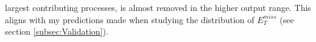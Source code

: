 largest contributing processes, is almost removed in the higher output range. This aligns with my predictions made when studying the 
distribution of $E_T^{miss}$ (see section \ref{subsec:Validation}). 
\begin{figure}
\end{figure}
